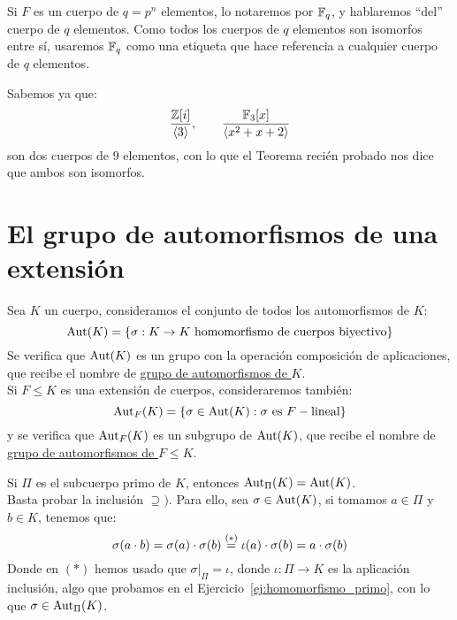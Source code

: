 \begin{notacion}
    Si $F$ es un cuerpo de $q=p^n$ elementos, lo notaremos por $\mathbb{F}_q$, y hablaremos ``del'' cuerpo de $q$ elementos. Como todos los cuerpos de $q$ elementos son isomorfos entre sí, usaremos $\mathbb{F}_q$ como una etiqueta que hace referencia a cualquier cuerpo de $q$ elementos.
\end{notacion}

\begin{ejemplo}
    Sabemos ya que:
    \begin{equation*}
        \dfrac{\mathbb{Z}[i]}{\langle 3 \rangle }, \qquad \dfrac{\mathbb{F}_3[x]}{\langle x^2+x+2 \rangle }
    \end{equation*}
    son dos cuerpos de $9$ elementos, con lo que el Teorema recién probado nos dice que ambos son isomorfos.
\end{ejemplo}

\section{El grupo de automorfismos de una extensión}
\begin{definicion}
    Sea $K$ un cuerpo, consideramos el conjunto de todos los automorfismos de $K$:
    \begin{equation*}
        \Aut(K) = \{\sigma:K\to K \text{\ homomorfismo de cuerpos biyectivo}\}
    \end{equation*}
    Se verifica que $\operatorname{Aut}(K)$ es un grupo con la operación composición de aplicaciones, que recibe el nombre de \underline{grupo de automorfismos de $K$}. \\

    \noindent
    Si $F\leq K$ es una extensión de cuerpos, consideraremos también:
    \begin{equation*}
        \Aut_F(K) = \{\sigma\in \Aut(K) : \sigma \text{\ es\ } F-\text{lineal}\}
    \end{equation*}
    y se verifica que $\operatorname{Aut}_F(K)$ es un subgrupo de $\operatorname{Aut}(K)$, que recibe el nombre de \underline{grupo de automorfismos de $F\leq K$}.\\
\end{definicion}

\begin{ejercicio}
    Si $\Pi$ es el subcuerpo primo de $K$, entonces $\operatorname{Aut}_\Pi(K) = \operatorname{Aut}(K)$.\\

    \noindent
    Basta probar la inclusión $\supseteq)$. Para ello, sea $\sigma\in \operatorname{Aut}(K)$, si tomamos $a\in \Pi$ y $b\in K$, tenemos que:
    \begin{equation*}
        \sigma(a\cdot b) = \sigma(a)\cdot \sigma(b) \stackrel{(\ast)}{=} \iota(a)\cdot \sigma(b) = a\cdot \sigma(b)
    \end{equation*}
    Donde en $(\ast)$ hemos usado que $\sigma\big|_\Pi=\iota$, donde $\iota:\Pi\to K$ es la aplicación inclusión, algo que probamos en el Ejercicio~\ref{ej:homomorfismo_primo}, con lo que $\sigma\in \operatorname{Aut}_\Pi(K)$.
\end{ejercicio}

